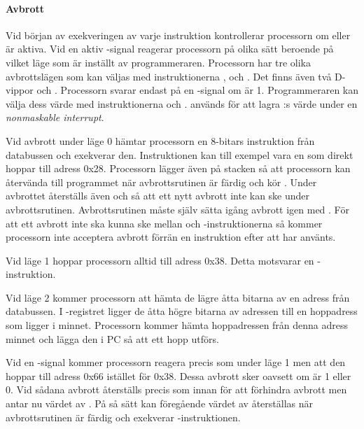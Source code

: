 \documentclass[main.tex]{subfiles}
\begin{document}
\paragraph{Avbrott}
Vid början av exekveringen av varje instruktion kontrollerar processorn om
 eller  är aktiva. Vid en aktiv -signal reagerar
processorn på olika sätt beroende på vilket läge som är inställt av
programmeraren. Processorn har tre olika avbrottslägen som kan väljas med
instruktionerna ,  och . Det finns även två
D-vippor  och . Processorn svarar endast på en
-signal om  är 1. Programmeraren kan välja dess värde med
instruktionerna  och .  används för att lagra
:s värde under en {\it nonmaskable interrupt}.

Vid avbrott under läge 0 hämtar processorn en 8-bitars instruktion från
databussen och exekverar den. Instruktionen kan till exempel vara en  som direkt hoppar till adress 0x28. Processorn lägger även  på
stacken så att processorn kan återvända till programmet när avbrottsrutinen är
färdig och kör . Under avbrottet återställs även  och
 så att ett nytt avbrott inte kan ske under avbrottsrutinen.
Avbrottsrutinen måste själv sätta igång avbrott igen med . För att ett
avbrott inte ska kunna ske mellan  och -instruktionerna så
kommer processorn inte acceptera avbrott förrän en instruktion efter att
 har använts.

Vid läge 1 hoppar processorn alltid till adress 0x38. Detta motsvarar en
-instruktion.

Vid läge 2 kommer processorn att hämta de lägre åtta bitarna av en adress från
databussen. I -registret ligger de åtta högre bitarna av adressen till
en hoppadress som ligger i minnet. Processorn kommer hämta hoppadressen från
denna adress minnet och lägga den i PC så att ett hopp utförs.

Vid en -signal kommer processorn reagera precis som under läge 1 men
att den hoppar till adress 0x66 istället för 0x38. Dessa avbrott sker oavsett
om  är 1 eller 0. Vid sådana avbrott återställs  precis
som innan för att förhindra avbrott men  antar nu värdet av
. På så sätt kan föregående värdet av  återställas när
avbrottsrutinen är färdig och exekverar -instruktionen.
\end{document}
